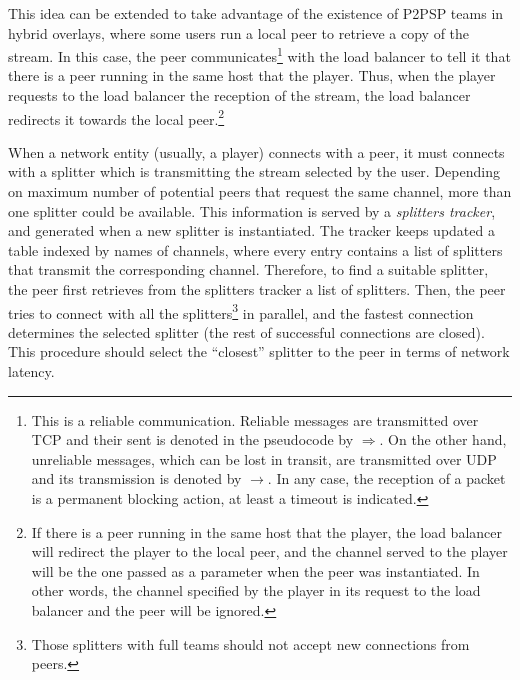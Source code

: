 This idea can be extended to take advantage of the existence of P2PSP
teams in hybrid overlays, where some users run a local peer to
retrieve a copy of the stream. In this case, the peer
communicates\footnote{This is a reliable communication. Reliable
  messages are transmitted over TCP and their sent is denoted in the
  pseudocode by $\Rightarrow$. On the other hand, unreliable messages,
  which can be lost in transit, are transmitted over UDP and its
  transmission is denoted by $\rightarrow$. In any case, the reception
  of a packet is a permanent blocking action, at least a timeout is
  indicated.} with the load balancer to tell it that there is a peer
running in the same host that the player. Thus, when the player
requests to the load balancer the reception of the stream, the load
balancer redirects it towards the local peer.\footnote{If there is a
  peer running in the same host that the player, the load balancer
  will redirect the player to the local peer, and the channel served
  to the player will be the one passed as a parameter when the peer
  was instantiated. In other words, the channel specified by the
  player in its request to the load balancer and the peer will be
  ignored.}

When a network entity (usually, a player) connects with a peer, it
must connects with a splitter which is transmitting the stream
selected by the user. Depending on maximum number of potential peers
that request the same channel, more than one splitter could be
available. This information is served by a \emph{splitters tracker},
and generated when a new splitter is instantiated. The tracker keeps
updated a table indexed by names of channels, where every entry
contains a list of splitters that transmit the corresponding
channel. Therefore, to find a suitable splitter, the peer first
retrieves from the splitters tracker a list of splitters. Then, the
peer tries to connect with all the splitters\footnote{Those splitters
with full teams should not accept new connections from peers.} in
parallel, and the fastest connection determines the selected splitter
(the rest of successful connections are closed). This procedure should
select the ``closest'' splitter to the peer in terms of network
latency.



